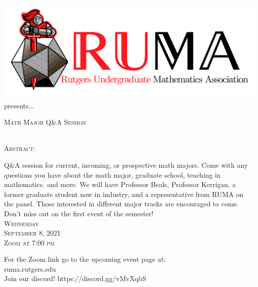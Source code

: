 \documentclass[12pt]{article}
\begin{document}

\begin{center}\includegraphics[scale=.45]{RUMAlogo.png}\\
\large  presents... \\

\vspace{2mm}
\begin{spacing}{1}
{\fontsize{40}{44}\selectfont  \textsc{
Math Major Q\&A Session}} \end{spacing}
 

 ~~\\

\normalsize
\textsc{Abstract:}

\LARGE 
Q\&A session for current, incoming, or prospective math
majors. Come with any questions you have about the math
major, graduate school, teaching in mathematics, and more. We will
have Professor Beals, Professor Kerrigan, a former graduate
student now in industry, and a representative from RUMA on the
panel. Those interested in different major tracks are encouraged
to come. Don't miss out on the first event of the semester!\\

\vspace{10mm} 
\Huge   \textsc{Wednesday\\September 8, 2021 \\Zoom at 7:00 pm}
\end{center}
\begin{center}
\Large  For the Zoom link go to the upcoming event page at:\\
ruma.rutgers.edu\\Join our 
discord! https://discord.gg/vMvXqbS
\end{center}
\end{document}
